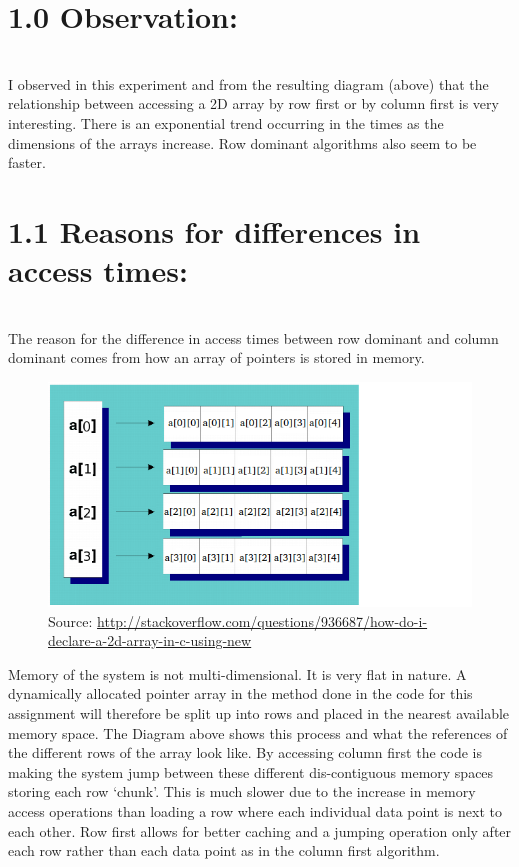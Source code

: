 \documentclass[11pt]{article}
\begin{document}
\begin{page}
\noindent \chapter{1.0 Observation:}\\
I observed in this experiment and from the resulting diagram (above) that the relationship between accessing a 2D array by row first or by column first is very interesting. There is an exponential trend occurring in the times as the dimensions of the arrays increase. Row dominant algorithms also seem to be faster.\\

\noindent \chapter{1.1 Reasons for differences in access times:}\\
The reason for the difference in access times between row dominant and column dominant comes from how an array of pointers is stored in memory.

\begin{figure}[ht]
\centering
     \includegraphics[width=1.0\textwidth]{M75kn}
     Source: \url{http://stackoverflow.com/questions/936687/how-do-i-declare-a-2d-array-in-c-using-new}\\
\end{figure}

\noindent Memory of the system is not multi-dimensional. It is very flat in nature. A dynamically allocated pointer array in the method done in the code for this assignment will therefore be split up into rows and placed in the nearest available memory space. The Diagram above shows this process and what the references of the different rows of the array look like. By accessing column first the code is making the system jump between these different dis-contiguous memory spaces storing each row ‘chunk’. This is much slower due to the increase in memory access operations than loading a row where each individual data point is next to each other. Row first allows for better caching and a jumping operation only after each row rather than each data point as in the column first algorithm.\\


\end{page}
\end{document}
